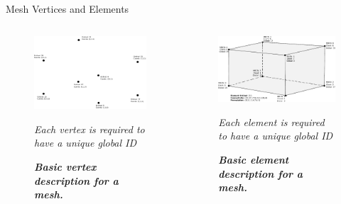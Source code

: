 \documentclass{beamer}
\begin{document}
\begin{frame}{Mesh Vertices and Elements}

  \begin{columns}
    
    \begin{column}{0.5\textwidth}
      \begin{figure}[htpb!]
        \centering \includegraphics[width=2.25in]{hex_nodes.pdf}
        \caption{\bf \sl Basic vertex description for a mesh.}{\sl
          Each vertex is required to have a unique global ID}
      \end{figure}
    \end{column}

    \begin{column}{0.5\textwidth}
      \begin{figure}[htpb!]
        \centering \includegraphics[width=2.25in]{hex_element.pdf}
        \caption{\bf \sl Basic element description for a mesh.}{\sl
          Each element is required to have a unique global ID}
      \end{figure}
    \end{column}

  \end{columns}

\end{frame}
\end{document}
